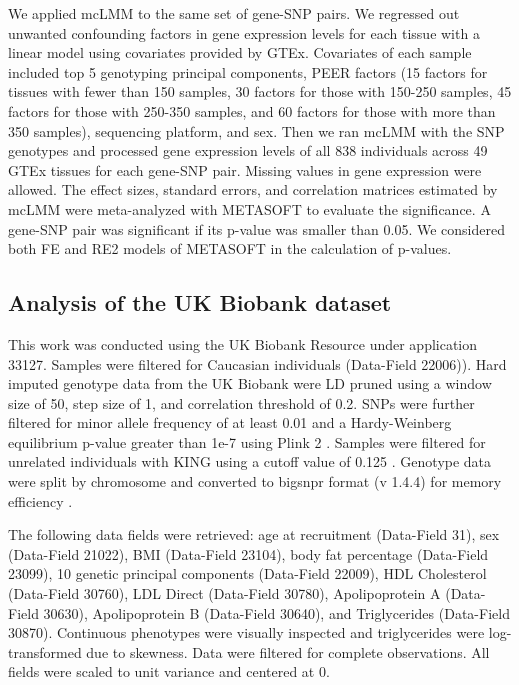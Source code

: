         We applied mcLMM to the same set of gene-SNP pairs. We regressed out unwanted confounding factors in gene expression levels for each tissue with a linear model using covariates provided by GTEx. Covariates of each sample included 
        top 5 genotyping principal components, PEER factors \cite{Stegle2012-zc} (15 factors for tissues with fewer than 150 samples, 30 factors for those with 150-250 samples, 45 factors for those with 250-350 samples, and 60 factors for those with more than 350 samples), sequencing platform, and sex. Then we ran mcLMM with the SNP genotypes and processed gene expression levels of all 838 individuals across 49 GTEx tissues for each gene-SNP pair. Missing values in gene expression were allowed. The effect sizes, standard errors, and correlation matrices estimated by mcLMM were meta-analyzed with METASOFT to evaluate the significance. A gene-SNP pair was significant if its p-value was smaller than 0.05. We considered both FE and RE2 models of METASOFT in the calculation of p-values.
    
    \subsection{Analysis of the UK Biobank dataset}
        This work was conducted using the UK Biobank Resource under application 33127. Samples were filtered for Caucasian individuals (Data-Field 22006)). Hard imputed genotype data from the UK Biobank were LD pruned using a window size of 50, step size of 1, and correlation threshold of 0.2. SNPs were further filtered for minor allele frequency of at least 0.01 and a Hardy-Weinberg equilibrium p-value greater than 1e-7 using Plink 2 \cite{PLINK2}. Samples were filtered for unrelated individuals with KING using a cutoff value of 0.125 \cite{KING}. Genotype data were split by chromosome and converted to bigsnpr format (v 1.4.4) for memory efficiency \cite{bigsnpr}.
        
        The following data fields were retrieved: age at recruitment (Data-Field 31), sex (Data-Field 21022), BMI (Data-Field 23104), body fat percentage (Data-Field 23099), 10 genetic principal components (Data-Field 22009), HDL Cholesterol (Data-Field 30760), LDL Direct (Data-Field 30780), Apolipoprotein A (Data-Field 30630), Apolipoprotein B (Data-Field 30640), and Triglycerides (Data-Field 30870). Continuous phenotypes were visually inspected and triglycerides were log-transformed due to skewness. Data were filtered for complete observations. All fields were scaled to unit variance and centered at 0. 
        
